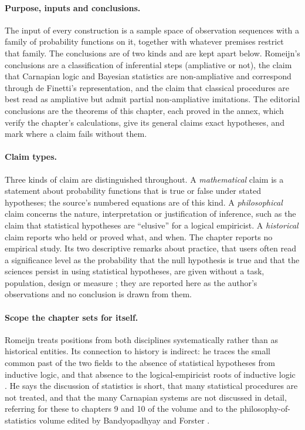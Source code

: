 \paragraph{Purpose, inputs and conclusions.}
The input of every construction is a sample space of observation
sequences with a family of probability functions on it, together with
whatever premises restrict that family. The conclusions are of two
kinds and are kept apart below. Romeijn's conclusions are a
classification of inferential steps (ampliative or not), the claim that
Carnapian logic and Bayesian statistics are non-ampliative and
correspond through de Finetti's representation, and the claim that
classical procedures are best read as ampliative but admit partial
non-ampliative imitations. The editorial conclusions are the theorems
of this chapter, each proved in the annex, which verify the chapter's
calculations, give its general claims exact hypotheses, and mark where
a claim fails without them.

\paragraph{Claim types.}
Three kinds of claim are distinguished throughout. A
\emph{mathematical} claim is a statement about probability functions
that is true or false under stated hypotheses; the source's numbered
equations are of this kind. A \emph{philosophical} claim concerns the
nature, interpretation or justification of inference, such as the
claim that statistical hypotheses are ``elusive'' for a logical
empiricist. A \emph{historical} claim reports who held or proved what,
and when. The chapter reports no empirical study. Its two descriptive
remarks about practice, that users often read a significance level as
the probability that the null hypothesis is true and that the sciences
persist in using statistical hypotheses, are given without a task,
population, design or measure \cite[pp.~636, 640]{Romeijn2011InductiveLogicStatistics};
they are reported here as the author's observations and no conclusion
is drawn from them.

\paragraph{Scope the chapter sets for itself.}
Romeijn treats positions from both disciplines systematically rather
than as historical entities. Its connection to history is indirect: he
traces the small common past of the two fields to the absence of
statistical hypotheses from inductive logic, and that absence to the
logical-empiricist roots of inductive logic \cite[p.~626]{Romeijn2011InductiveLogicStatistics}.
He says the discussion of statistics is short, that many statistical
procedures are not treated, and that the many Carnapian systems are not
discussed in detail, referring for these to chapters 9 and 10 of the
volume and to the philosophy-of-statistics volume edited by
Bandyopadhyay and Forster \cite[p.~626]{Romeijn2011InductiveLogicStatistics}.

